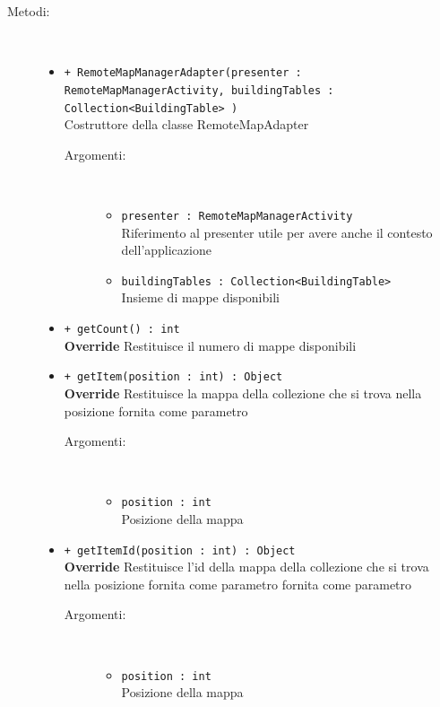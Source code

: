 \documentclass[../DefinizioneDiProdotto.tex]{subfiles}
\begin{document}
\begin{description}
\begin{itemize}
	\end{itemize}
	\item[Metodi:] \
	\begin{itemize}
		\item \texttt{+ RemoteMapManagerAdapter(presenter : RemoteMapManagerActivity, buildingTables : Collection<BuildingTable> )}\\
		Costruttore della classe RemoteMapAdapter
		\begin{description}
			\item[Argomenti:] \
			\begin{itemize}
				\item \texttt{presenter : RemoteMapManagerActivity}\\
				Riferimento al presenter utile per avere anche il contesto dell'applicazione\item \texttt{buildingTables : Collection<BuildingTable> }\\
				Insieme di mappe disponibili\end{itemize}
		\end{description}
		\item \texttt{+ getCount() : int}\\
		\textbf{Override} Restituisce il numero di mappe disponibili
		\item \texttt{+ getItem(position : int) : Object}\\
		\textbf{Override} Restituisce la mappa della collezione che si trova nella posizione fornita come parametro
		\begin{description}
			\item[Argomenti:] \
			\begin{itemize}
				\item \texttt{position : int}\\
				Posizione della mappa\end{itemize}
		\end{description}
		\item \texttt{+ getItemId(position : int) : Object}\\
		\textbf{Override} Restituisce l'id della mappa della collezione che si trova nella posizione fornita come parametro fornita come parametro
		\begin{description}
			\item[Argomenti:] \
			\begin{itemize}
				\item \texttt{position : int}\\
				Posizione della mappa\end{itemize}

\end{description}
\end{itemize}
\end{description}
\end{document}
